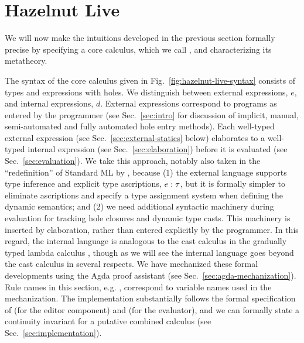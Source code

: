 \newcommand{\calculusSec}{Hazelnut Live}
\section{\protect\calculusSec}
\label{sec:calculus}





We will now make the intuitions developed in the previous section formally
precise by specifying a core calculus, which we call \HazelnutLive, and
characterizing its metatheory.

 The syntax of the core calculus given in
Fig.~\ref{fig:hazelnut-live-syntax} consists of types and expressions with
holes.  We distinguish between {external} expressions, $e$, and {internal}
expressions, $d$.  External expressions correspond to programs as entered
by the programmer (see Sec.~\ref{sec:intro} for discussion of implicit,
manual, semi-automated and fully automated hole entry methods).  Each
well-typed external expression (see Sec.~\ref{sec:external-statics} below)
elaborates to a well-typed internal expression (see
Sec.~\ref{sec:elaboration}) before it is evaluated (see
Sec.~\ref{sec:evaluation}).  We take this approach, notably also taken in
the ``redefinition'' of Standard ML by \citet{Harper00atype-theoretic},
because (1) the external language supports type inference and explicit type
ascriptions, $e : \tau$, but it is formally simpler to eliminate
ascriptions and specify a type assignment system when defining the dynamic
semantics; and (2) we need additional syntactic machinery during evaluation
for tracking hole closures and dynamic type casts.  This machinery is
inserted by elaboration, rather than entered explicitly by the programmer.
In this regard, the internal language is analogous to the cast calculus in
the gradually typed lambda calculus
\cite{DBLP:conf/snapl/SiekVCB15,Siek06a}, though as we will see the
\HazelnutLive internal language goes beyond the cast calculus in several
respects. We have mechanized these formal developments using the Agda proof
assistant \cite{norell:thesis,norell2009dependently} (see
Sec.~\ref{sec:agda-mechanization}). Rule names in this section,
e.g. , correspond to variable names used in the
mechanization. The \Hazel implementation substantially follows the formal
specification of \Hazelnut (for the editor component) and \HazelnutLive
(for the evaluator), and we can formally state a continuity invariant for a
putative combined calculus (see Sec.~\ref{sec:implementation}).

